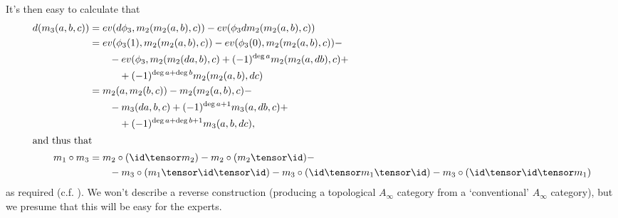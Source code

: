 It's then easy to calculate that
\begin{align*}
d(m_3(a,b,c)) & = ev(d \phi_3, m_2(m_2(a,b),c)) - ev(\phi_3 d m_2(m_2(a,b), c)) \\
 & = ev( \phi_3(1), m_2(m_2(a,b),c)) - ev(\phi_3(0), m_2 (m_2(a,b),c)) - \\ & \qquad - ev(\phi_3, m_2(m_2(da, b), c) + (-1)^{\deg a} m_2(m_2(a, db), c) + \\ & \qquad \quad + (-1)^{\deg a+\deg b} m_2(m_2(a, b), dc) \\
 & = m_2(a , m_2(b,c)) - m_2(m_2(a,b),c) - \\ & \qquad - m_3(da,b,c) + (-1)^{\deg a + 1} m_3(a,db,c) + \\ & \qquad \quad + (-1)^{\deg a + \deg b + 1} m_3(a,b,dc), \\
\intertext{and thus that}
m_1 \circ m_3 & =  m_2 \circ (\id \tensor m_2) - m_2 \circ (m_2 \tensor \id) - \\ & \qquad - m_3 \circ (m_1 \tensor \id \tensor \id) - m_3 \circ (\id \tensor m_1 \tensor \id) - m_3 \circ (\id \tensor \id \tensor m_1)
\end{align*}
as required (c.f. \cite[p. 6]{MR1854636}).
We won't describe a reverse construction (producing a topological $A_\infty$ category from a `conventional' $A_\infty$ category), but we presume that this will be easy for the experts.